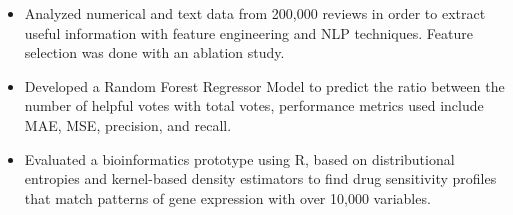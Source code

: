 \documentclass[10pt,a4paper]{altacv}
\begin{document}
\medskip




\begin{itemize}
  \item \small Analyzed numerical and text data from 200,000 reviews in order to extract useful information with feature engineering and NLP techniques. Feature selection was done with an ablation study. 
    \item \small Developed a Random Forest Regressor Model to predict the ratio between the number of helpful votes with total votes, performance metrics used include MAE, MSE, precision, and recall. 
\end{itemize}

\medskip




\begin{itemize}
  \item \small{Evaluated a bioinformatics prototype using R, based on distributional entropies and kernel-based density estimators to find drug sensitivity profiles that match patterns of gene expression with over 10,000 variables.}
\end{itemize}
\end{document}
